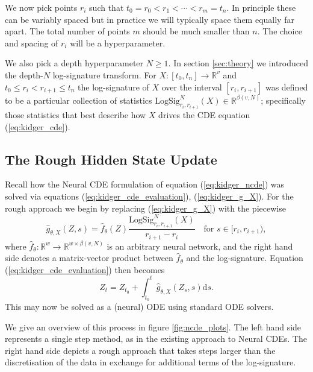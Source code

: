 \documentclass{article}
\newcommand{\logsig}{\mathrm{LogSig}}
\newcommand{\dby}{\mathrm{d}}
\newcommand{\reals}{\mathbb{R}}
\begin{document}
We now pick points $r_i$ such that $t_0 = r_0 < r_1 < \cdots < r_m = t_n$. In principle these can be variably spaced but in practice we will typically space them equally far apart. The total number of points $m$ should be much smaller than $n$. The choice and spacing of $r_i$ will be a hyperparameter.

We also pick a depth hyperparameter $N \geq 1$. In section \ref{sec:theory} we introduced the depth-$N$ log-signature transform. For $X \colon [t_0, t_n] \to \reals^v$ and $t_0 \leq r_i < r_{i + 1} \leq t_n$ the log-signature of $X$ over the interval $[r_i, r_{i+1}]$ was defined to be a particular collection of statistics $\logsig^N_{r_i, r_{i+1}}(X) \in \reals^{\beta(v, N)}$; specifically those statistics that best describe how $X$ drives the CDE equation (\ref{eq:kidger_cde}).

\subsection{The Rough Hidden State Update}

Recall how the Neural CDE formulation of equation (\ref{eq:kidger_ncde}) was solved via equations (\ref{eq:kidger_cde_evaluation}), (\ref{eq:kidger_g_X}). For the rough approach we begin by replacing (\ref{eq:kidger_g_X}) with the piecewise
\begin{equation}
    \widehat{g}_{\theta, X}(Z, s) = \widehat{f}_\theta(Z) \frac{\logsig_{r_i, r_{i+1}}^N(X)}{r_{i+1} - r_i} \quad \text{for } s \in [r_i, r_{i + 1}),
    \label{eq:log_ode_g}
\end{equation}
where $\widehat{f}_\theta \colon \reals^w \to \reals^{w \times \beta(v, N)}$ is an arbitrary neural network, and the right hand side denotes a matrix-vector product between $\widehat{f}_\theta$ and the log-signature. Equation (\ref{eq:kidger_cde_evaluation}) then becomes
\begin{equation}
    Z_t = Z_{t_0} + \int^{t}_{t_0} \widehat{g}_{\theta, X}(Z_s, s) \dby s.
    \label{eq:log_ode_ncde}
\end{equation}
This may now be solved as a (neural) ODE using standard ODE solvers.

We give an overview of this process in figure \ref{fig:ncde_plots}. The left hand side represents a single step method, as in the existing approach to Neural CDEs. The right hand side depicts a rough approach that takes steps larger than the discretisation of the data in exchange for additional terms of the log-signature.
\end{document}
